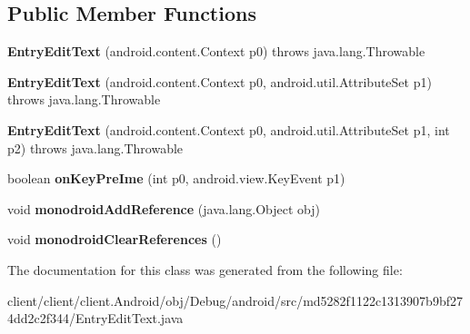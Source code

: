 \subsection*{Public Member Functions}
\begin{DoxyCompactItemize}
\item 
\hypertarget{classmd5282f1122c1313907b9bf274dd2c2f344_1_1EntryEditText_a3f7cccadc2b4cd52d6dcbaedbd74ad47}{}{\bfseries Entry\+Edit\+Text} (android.\+content.\+Context p0)  throws java.\+lang.\+Throwable 	\label{classmd5282f1122c1313907b9bf274dd2c2f344_1_1EntryEditText_a3f7cccadc2b4cd52d6dcbaedbd74ad47}

\item 
\hypertarget{classmd5282f1122c1313907b9bf274dd2c2f344_1_1EntryEditText_a6cef7b4ffde3fb2b7d4fdf9177af4395}{}{\bfseries Entry\+Edit\+Text} (android.\+content.\+Context p0, android.\+util.\+Attribute\+Set p1)  throws java.\+lang.\+Throwable 	\label{classmd5282f1122c1313907b9bf274dd2c2f344_1_1EntryEditText_a6cef7b4ffde3fb2b7d4fdf9177af4395}

\item 
\hypertarget{classmd5282f1122c1313907b9bf274dd2c2f344_1_1EntryEditText_afb63110005b8464f1d7801ad1f52ea55}{}{\bfseries Entry\+Edit\+Text} (android.\+content.\+Context p0, android.\+util.\+Attribute\+Set p1, int p2)  throws java.\+lang.\+Throwable 	\label{classmd5282f1122c1313907b9bf274dd2c2f344_1_1EntryEditText_afb63110005b8464f1d7801ad1f52ea55}

\item 
\hypertarget{classmd5282f1122c1313907b9bf274dd2c2f344_1_1EntryEditText_a79f4a49953ee1d9b7b4ef49ad71d7e40}{}boolean {\bfseries on\+Key\+Pre\+Ime} (int p0, android.\+view.\+Key\+Event p1)\label{classmd5282f1122c1313907b9bf274dd2c2f344_1_1EntryEditText_a79f4a49953ee1d9b7b4ef49ad71d7e40}

\item 
\hypertarget{classmd5282f1122c1313907b9bf274dd2c2f344_1_1EntryEditText_ab9549b01175e1791c01885dc1b9f7418}{}void {\bfseries monodroid\+Add\+Reference} (java.\+lang.\+Object obj)\label{classmd5282f1122c1313907b9bf274dd2c2f344_1_1EntryEditText_ab9549b01175e1791c01885dc1b9f7418}

\item 
\hypertarget{classmd5282f1122c1313907b9bf274dd2c2f344_1_1EntryEditText_a2387f89d7bf15dce13050f4b3b5bf9f0}{}void {\bfseries monodroid\+Clear\+References} ()\label{classmd5282f1122c1313907b9bf274dd2c2f344_1_1EntryEditText_a2387f89d7bf15dce13050f4b3b5bf9f0}

\end{DoxyCompactItemize}


The documentation for this class was generated from the following file\+:\begin{DoxyCompactItemize}
\item 
client/client/client.\+Android/obj/\+Debug/android/src/md5282f1122c1313907b9bf274dd2c2f344/Entry\+Edit\+Text.\+java\end{DoxyCompactItemize}
